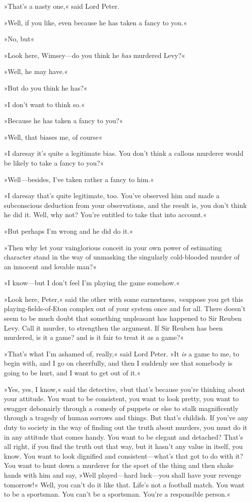 »That's a nasty one,« said Lord Peter.

»Well, if you like, even because he has taken a fancy to you.«

»No, but\longdash«

»Look here, Wimsey—do you think he \textit{has} murdered Levy?«

»Well, he may have.«

»But do you think he has?«

»I don't want to think so.«

»Because he has taken a fancy to you?«

»Well, that biases me, of course\longdash«

»I daresay it's quite a legitimate bias. You don't think a callous murderer would be likely to take a fancy to you?«

»Well—besides, I've taken rather a fancy to him.«

»I daresay that's quite legitimate, too. You've observed him and made a subconscious deduction from your observations, and the result is, you don't think he did it. Well, why not? You're entitled to take that into account.«

»But perhaps I'm wrong and he did do it.«

»Then why let your vainglorious conceit in your own power of estimating character stand in the way of unmasking the singularly cold-blooded murder of an innocent and lovable man?«

»I know—but I don't feel I'm playing the game somehow.«

»Look here, Peter,« said the other with some earnestness, »suppose you get this playing-fields-of-Eton complex out of your system once and for all. There doesn't seem to be much doubt that something unpleasant has happened to Sir Reuben Levy. Call it murder, to strengthen the argument. If Sir Reuben has been murdered, is it a game? and is it fair to treat it as a game?«

»That's what I'm ashamed of, really,« said Lord Peter. »It \textit{is} a game to me, to begin with, and I go on cheerfully, and then I suddenly see that somebody is going to be hurt, and I want to get out of it.«

»Yes, yes, I know,« said the detective, »but that's because you're thinking about your attitude. You want to be consistent, you want to look pretty, you want to swagger debonairly through a comedy of puppets or else to stalk magnificently through a tragedy of human sorrows and things. But that's childish. If you've any duty to society in the way of finding out the truth about murders, you must do it in any attitude that comes handy. You want to be elegant and detached? That's all right, if you find the truth out that way, but it hasn't any value in itself, you know. You want to look dignified and consistent—what's that got to do with it? You want to hunt down a murderer for the sport of the thing and then shake hands with him and say, »Well played—hard luck—you shall have your revenge tomorrow!« Well, you can't do it like that. Life's not a football match. You want to be a sportsman. You can't be a sportsman. You're a responsible person.«

